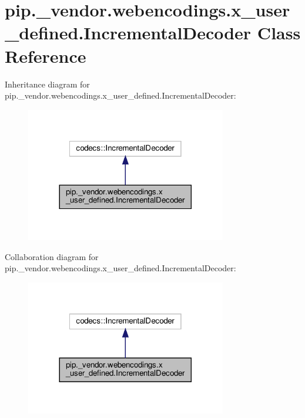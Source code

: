 \hypertarget{classpip_1_1__vendor_1_1webencodings_1_1x__user__defined_1_1IncrementalDecoder}{}\section{pip.\+\_\+vendor.\+webencodings.\+x\+\_\+user\+\_\+defined.\+Incremental\+Decoder Class Reference}
\label{classpip_1_1__vendor_1_1webencodings_1_1x__user__defined_1_1IncrementalDecoder}


Inheritance diagram for pip.\+\_\+vendor.\+webencodings.\+x\+\_\+user\+\_\+defined.\+Incremental\+Decoder\+:
\nopagebreak
\begin{figure}[H]
\begin{center}
\leavevmode
\includegraphics[width=248pt]{classpip_1_1__vendor_1_1webencodings_1_1x__user__defined_1_1IncrementalDecoder__inherit__graph}
\end{center}
\end{figure}


Collaboration diagram for pip.\+\_\+vendor.\+webencodings.\+x\+\_\+user\+\_\+defined.\+Incremental\+Decoder\+:
\nopagebreak
\begin{figure}[H]
\begin{center}
\leavevmode
\includegraphics[width=248pt]{classpip_1_1__vendor_1_1webencodings_1_1x__user__defined_1_1IncrementalDecoder__coll__graph}
\end{center}
\end{figure}

